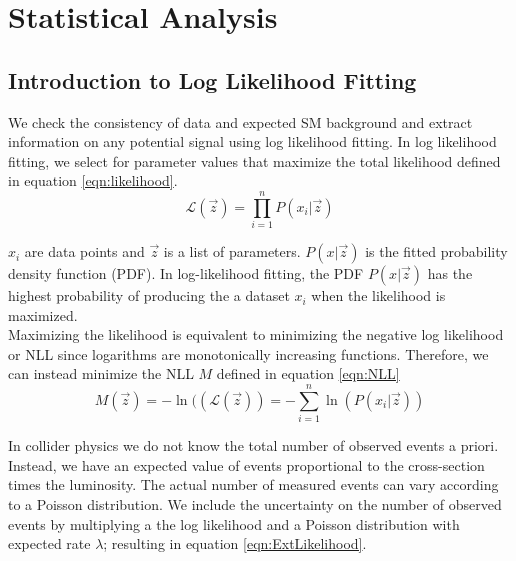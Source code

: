 \chapter{Statistical Analysis}
\label{chap:statistics}

\section{Introduction to Log Likelihood Fitting}
\label{sec:stat:likelihood}

\indent We check the consistency of data and expected SM background and extract information on any potential signal using log likelihood fitting.  In log likelihood fitting, we select for parameter values that maximize the total likelihood defined in equation \ref{eqn:likelihood}.  \\

\begin{equation}
\label{eqn:likelihood}
{\mathcal{L}}(\vec{z}) = {\displaystyle\prod_{i=1}^{n}} P(x_i|\vec{z})
\end{equation}

\indent $x_i$ are data points and $\vec{z}$ is a list of parameters. $P(x|\vec{z})$ is the fitted probability density function (PDF).  In log-likelihood fitting, the PDF $P(x|\vec{z})$ has the highest probability of producing the a dataset $x_i$ when the likelihood is maximized. \\

\indent Maximizing the likelihood is equivalent to minimizing the negative log likelihood or NLL since logarithms are monotonically increasing functions.  Therefore, we can instead minimize the NLL $M$ defined in equation \ref{eqn:NLL} \\

\begin{equation}
\label{eqn:NLL}
M(\vec{z})=-\ln(({\mathcal{L}}(\vec{z})) = -{\displaystyle\sum_{i=1}^{n}} \ln( P(x_i|\vec{z}) )
\end{equation}

\indent In collider physics we do not know the total number of observed events a priori.  Instead, we have an expected value of events proportional to the cross-section times the luminosity.  The actual number of measured events can vary according to a Poisson distribution.  We include the uncertainty on the number of observed events by multiplying a the log likelihood and a Poisson distribution with expected rate $\lambda$; resulting in equation \ref{eqn:ExtLikelihood}.  \\

